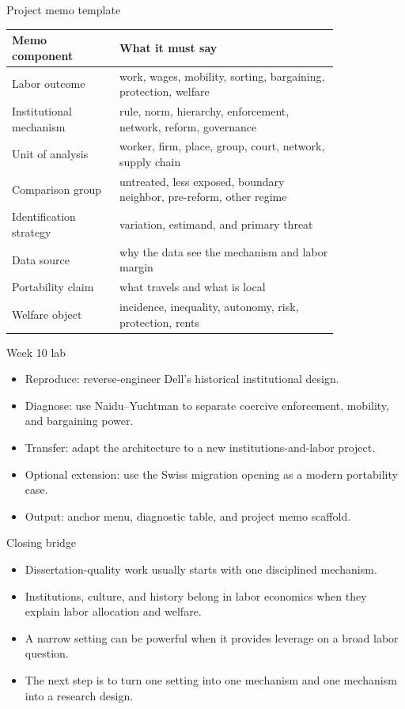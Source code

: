 \documentclass[aspectratio=169,11pt]{beamer}
\begin{document}
\begin{frame}{Project memo template}
\small
\begin{tabular}{p{0.27\linewidth} p{0.55\linewidth}}
\toprule
Memo component & What it must say \\
\midrule
Labor outcome & work, wages, mobility, sorting, bargaining, protection, welfare \\
Institutional mechanism & rule, norm, hierarchy, enforcement, network, reform, governance \\
Unit of analysis & worker, firm, place, group, court, network, supply chain \\
Comparison group & untreated, less exposed, boundary neighbor, pre-reform, other regime \\
Identification strategy & variation, estimand, and primary threat \\
Data source & why the data see the mechanism and labor margin \\
Portability claim & what travels and what is local \\
Welfare object & incidence, inequality, autonomy, risk, protection, rents \\
\bottomrule
\end{tabular}
\end{frame}

\begin{frame}{Week 10 lab}
\begin{itemize}
    \item Reproduce: reverse-engineer Dell's historical institutional design.
    \item Diagnose: use Naidu--Yuchtman to separate coercive enforcement, mobility, and bargaining power.
    \item Transfer: adapt the architecture to a new institutions-and-labor project.
    \item Optional extension: use the Swiss migration opening as a modern portability case.
    \item Output: anchor menu, diagnostic table, and project memo scaffold.
\end{itemize}
\end{frame}

\begin{frame}{Closing bridge}
\begin{itemize}
    \item Dissertation-quality work usually starts with one disciplined mechanism.
    \item Institutions, culture, and history belong in labor economics when they explain labor allocation and welfare.
    \item A narrow setting can be powerful when it provides leverage on a broad labor question.
    \item The next step is to turn one setting into one mechanism and one mechanism into a research design.
\end{itemize}
\end{frame}
\end{document}
